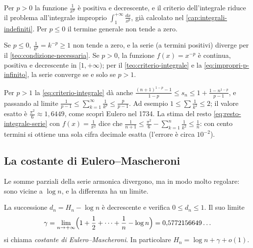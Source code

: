 \begin{schema}
\end{schema}

\begin{strategia}
Per $p>0$ la funzione $\frac1{x^{p}}$ è positiva e decrescente, e il criterio dell'integrale
riduce il problema all'integrale improprio $\int_{1}^{+\infty}\frac{dx}{x^{p}}$, già calcolato nel
\cref{cap:integrali-indefiniti}. Per $p\le0$ il termine generale non tende a zero.
\end{strategia}

\begin{dimostrazione}
Se $p\le0$, $\frac1{k^{p}}=k^{-p}\ge1$ non tende a zero, e la serie (a termini positivi) diverge
per il \cref{teo:condizione-necessaria}. Se $p>0$, la funzione $f(x)=x^{-p}$ è continua,
positiva e decrescente in $[1,+\infty)$; per il \cref{teo:criterio-integrale} e la
\eqref{eq:impropri-p-infinito}, la serie converge se e solo se $p>1$.
\end{dimostrazione}

Per $p>1$ la \eqref{eq:criterio-integrale} dà anche
$\frac{(n+1)^{1-p}-1}{1-p}\le s_{n}\le1+\frac{1-n^{1-p}}{p-1}$, e passando al limite
$\frac1{p-1}\le\sum_{k=1}^{\infty}\frac1{k^{p}}\le\frac p{p-1}$. Ad esempio $1\le\sum\frac1{k^{2}}\le2$; il valore esatto
è $\frac{\pi^{2}}6\approx1{,}6449$, come scoprì Eulero nel 1734. La stima del resto
\eqref{eq:resto-integrale-serie} con $f(x)=\frac1{x^{2}}$ dice che
$\frac1{n+1}\le\frac{\pi^{2}}6-\sum_{k=1}^{n}\frac1{k^{2}}\le\frac1n$: con cento termini si ottiene una sola cifra
decimale esatta (l'errore è circa $10^{-2}$).

\subsection{La costante di Eulero--Mascheroni}

Le somme parziali della serie armonica divergono, ma in modo molto regolare: sono vicine
a $\log n$, e la differenza ha un limite.

\begin{proposizione}\label{prop:eulero-mascheroni}
La successione $d_{n}=H_{n}-\log n$ è decrescente e verifica $0\le d_{n}\le1$. Il suo limite
\begin{equation}\label{eq:eulero-mascheroni}
  \gamma=\lim_{n\to+\infty}\Bigl(1+\frac12+\dots+\frac1n-\log n\Bigr)=0{,}5772156649\ldots
\end{equation}
si chiama \emph{costante di Eulero--Mascheroni}. In particolare $H_{n}=\log n+\gamma+o(1)$.
\end{proposizione}

